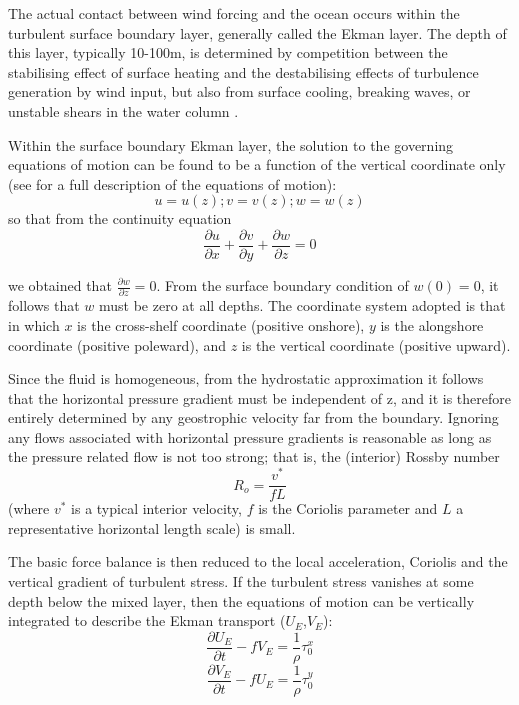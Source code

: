 The actual contact between wind forcing and the ocean occurs
within the turbulent surface boundary layer, generally called the
Ekman layer. The depth of this layer, typically 10-100m, is
determined by competition between the stabilising effect of
surface heating and the destabilising effects of turbulence
generation by wind input, but also from surface cooling, breaking
waves, or unstable shears in the water column \citep{Brink98}.

Within the surface boundary Ekman layer, the solution to the
governing equations of motion can be found to be a function of the
vertical coordinate only (see \citealp{Pedlosky87} for a full
description of the equations of motion):
\begin{equation}\label{eq:coord}
  u=u(z); v=v(z); w=w(z)
\end{equation}
so that from the continuity equation
\begin{equation}\label{eq:continuity}
  \frac{\partial u}{\partial x}+\frac{\partial v}{\partial y}
  +\frac{\partial w}{\partial z}=0
\end{equation}

we obtained that $\frac{\partial w}{\partial z}=0$. From the
surface boundary condition of $w(0)=0$, it follows that $w$ must
be zero at all depths. The coordinate system adopted is that in
which $x$ is the cross-shelf coordinate (positive onshore), $y$ is
the alongshore coordinate (positive poleward), and $z$ is the
vertical coordinate (positive upward).

Since the fluid is homogeneous, from the hydrostatic approximation
it follows that the horizontal pressure gradient must be
independent of z, and it is therefore entirely determined by any
geostrophic velocity far from the boundary. Ignoring any flows
associated with horizontal pressure gradients is reasonable as
long as the pressure related flow is not too strong; that is, the
(interior) Rossby number
\begin{equation}\label{eq:rossby}
  R_{o}=\frac{v^{*}}{fL}
\end{equation}
(where $v^{*}$ is a typical interior velocity, $f$ is the Coriolis
parameter and $L$ a representative horizontal length scale) is
small.

The basic force balance is then reduced to the local acceleration,
Coriolis and the vertical gradient of turbulent stress. If the
turbulent stress vanishes at some depth below the mixed layer,
then the equations of motion can be vertically integrated to
describe the Ekman transport ($U_{E}$,$V_{E}$):
\begin{equation}\label{eq:ekmanu}
  \frac{\partial U_{E}}{\partial
  t}-fV_{E}=\frac{1}{\rho}\tau_{0}^{x}
\end{equation}
\begin{equation}\label{eq:ekmanv}
  \frac{\partial V_{E}}{\partial
  t}-fU_{E}=\frac{1}{\rho}\tau_{0}^{y}
\end{equation}

